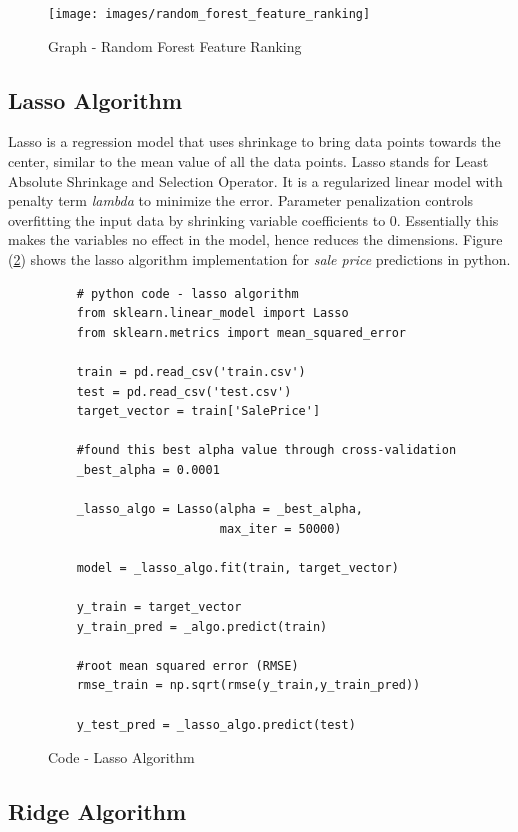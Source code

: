 \documentclass[sigconf]{acmart}
\begin{document}
	\begin{figure}[htb]
		\centering
		\texttt{[image: images/random\_forest\_feature\_ranking]}	
		\caption{Graph - Random Forest Feature Ranking} \label{fig:random-feature-ranking} 
	\end{figure}
		
	\subsection{Lasso Algorithm}
	
	Lasso is a regression model that uses shrinkage to bring data points towards the center, similar to the mean value of all the data points. Lasso stands for Least Absolute Shrinkage and Selection Operator. It is a regularized linear model with penalty term {\em lambda} to minimize the error. Parameter penalization controls overfitting the input data by shrinking variable coefficients to 0. Essentially this makes the variables no effect in the model, hence reduces the dimensions. Figure (\ref{c:lasso}) shows the lasso algorithm implementation for {\em sale price} predictions in python.
		
	\begin{figure}[htb]
	\begin{verbatim}	
	# python code - lasso algorithm
	from sklearn.linear_model import Lasso
	from sklearn.metrics import mean_squared_error
	
	train = pd.read_csv('train.csv')
	test = pd.read_csv('test.csv')
	target_vector = train['SalePrice']
	
	#found this best alpha value through cross-validation
	_best_alpha = 0.0001	
	
	_lasso_algo = Lasso(alpha = _best_alpha, 
	                    max_iter = 50000)
	
	model = _lasso_algo.fit(train, target_vector)  
		
	y_train = target_vector
	y_train_pred = _algo.predict(train)
	
	#root mean squared error (RMSE)
	rmse_train = np.sqrt(rmse(y_train,y_train_pred))
		
	y_test_pred = _lasso_algo.predict(test)	
	\end{verbatim}
	\caption{Code - Lasso Algorithm} \label{c:lasso} 
	\end{figure}
	
	\subsection{Ridge Algorithm}
	
\end{document}
